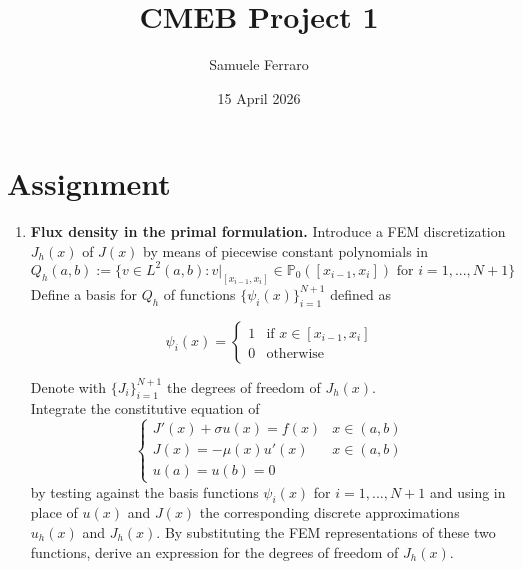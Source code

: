 \documentclass{article}
\title{CMEB Project 1}
\author{Samuele Ferraro}
\date{15 April 2026}
\begin{document}
\maketitle
\newpage
\tableofcontents 
\newpage

\section{Assignment}
   

\begin{enumerate}[label=\alph*)]
    \item \textbf{Flux density in the primal formulation.} Introduce a FEM discretization $J_{h}(x)$ of $J(x)$ by means of piecewise constant polynomials in
    \begin{equation}
        Q_{h}(a,b):=\{v\in L^{2}(a,b):v|_{[x_{i-1},x_{i}]}\in\mathbb{P}_{0}([x_{i-1},x_{i}]) \text{ for } i=1,...,N+1\}
    \end{equation}
    Define a basis for $Q_{h}$ of functions $\{\psi_{i}(x)\}_{i=1}^{N+1}$ defined as

    \begin{equation}
    \psi_{i}(x) =
        \begin{cases}
            1 & \text{if } x \in [x_{i-1}, x_{i}] \\
            0 & \text{otherwise}
        \end{cases}
        \label{BasisFunctionPrimal}
    \end{equation}

    Denote with $\{J_{i}\}_{i=1}^{N+1}$ the degrees of freedom of $J_{h}(x)$.\\
    Integrate the constitutive equation of 
    \begin{equation}
        \begin{cases}
            J'(x) + \sigma u(x) = f(x) & x \in (a, b) \\
            J(x) = -\mu(x) u'(x)  & x \in (a, b) \\
            u(a) = u(b) = 0
        \end{cases}
        \label{PrimalWeakFormulation}
    \end{equation}
    by testing against the basis functions $\psi_{i}(x)$ for $i=1,...,N+1$ and using in place of $u(x)$ and $J(x)$ the corresponding discrete approximations $u_{h}(x)$ and $J_{h}(x)$. By substituting the FEM representations of these two functions, derive an expression for the degrees of freedom of $J_{h}(x)$.


\end{enumerate}
\end{document}
